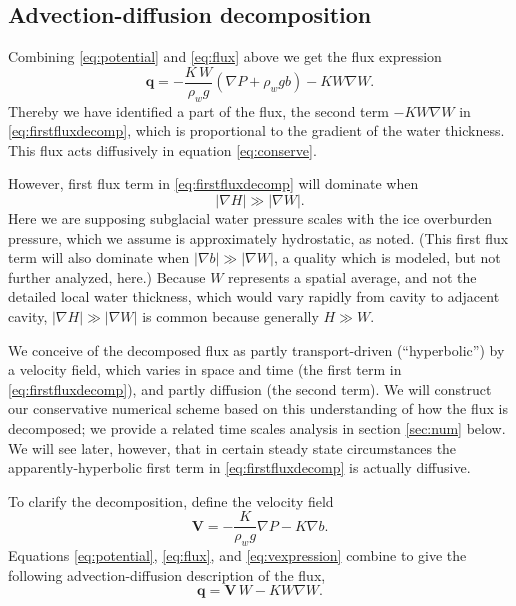 \documentclass[11pt,final]{amsart}%
\newcommand\bV{\mathbf{V}}
\newcommand\bq{\mathbf{q}}
\newcommand{\grad}{\nabla}
\begin{document}
\subsection*{Advection-diffusion decomposition}  Combining \eqref{eq:potential} and \eqref{eq:flux} above we get the flux expression
\begin{equation}
  \bq = - \frac{K\, W}{\rho_w g} \left(\grad P + \rho_w g b\right) - K W \grad W. \label{eq:firstfluxdecomp}
\end{equation}
Thereby we have identified a part of the flux, the second term $-K W \grad W$ in \eqref{eq:firstfluxdecomp}, which is proportional to the gradient of the water thickness.  This flux acts diffusively in equation \eqref{eq:conserve}.

However, first flux term in \eqref{eq:firstfluxdecomp} will dominate when
    $$|\grad H| \gg |\grad W|.$$
Here we are supposing subglacial water pressure scales with the ice overburden pressure, which we assume is approximately hydrostatic, as noted.  (This first flux term will also dominate when $|\grad b| \gg |\grad W|$, a quality which is modeled, but not further analyzed, here.)  Because $W$ represents a spatial average, and not the detailed local water thickness, which would vary rapidly from cavity to adjacent cavity, $|\grad H| \gg |\grad W|$ is common because generally $H\gg W$.

We conceive of the decomposed flux as partly transport-driven (``hyperbolic'') by a velocity field, which varies in space and time (the first term in \eqref{eq:firstfluxdecomp}), and partly diffusion (the second term).  We will construct our conservative numerical scheme based on this understanding of how the flux is decomposed; we provide a related time scales analysis in section \ref{sec:num} below.  We will see later, however, that in certain steady state circumstances the apparently-hyperbolic first term in \eqref{eq:firstfluxdecomp} is actually diffusive.

To clarify the decomposition, define the velocity field
\begin{equation} \label{eq:vexpression}
  \bV = - \frac{K}{\rho_w g} \grad P - K \grad b.
\end{equation}
Equations \eqref{eq:potential}, \eqref{eq:flux}, and \eqref{eq:vexpression} combine to give the following advection-diffusion description of the flux,
\begin{equation} \label{eq:qexpression}
  \bq = \bV\, W - K W \grad W.
\end{equation}
\end{document}
